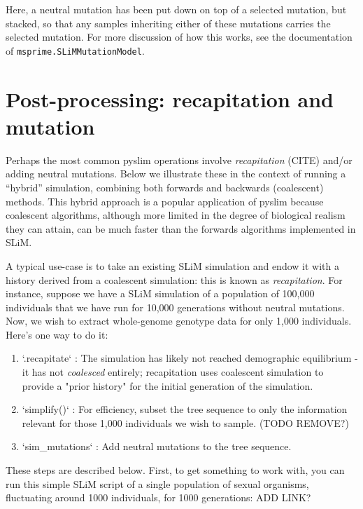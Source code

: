 \documentclass[12pt]{article}
\begin{document}
Here, a neutral mutation has been put down on top of a selected mutation, but stacked,
so that any samples inheriting either of these mutations carries the selected mutation.
For more discussion of how this works, see  the documentation of \verb|msprime.SLiMMutationModel|.



\section*{Post-processing: recapitation and mutation}

Perhaps the most common pyslim operations involve \textit{recapitation} (CITE)
and/or adding neutral mutations.
Below we illustrate these in the context of running a ``hybrid'' simulation, combining
both forwards and backwards (coalescent) methods. This hybrid approach is a popular
application of pyslim because coalescent algorithms, although more limited in the degree
of biological realism they can attain, can be much faster than the forwards algorithms
implemented in SLiM.

A typical use-case is to take an existing SLiM simulation and endow
it with a history derived from a coalescent simulation: this is known as \textit{recapitation}.
For instance, suppose we have a SLiM simulation of a population of 100,000 individuals
that we have run for 10,000 generations without neutral mutations. Now, we wish to
extract whole-genome genotype data for only 1,000 individuals. Here's one way to do it:

\begin{enumerate}
    \item `.recapitate` :
       The simulation has likely not reached demographic equilibrium - it has not
        \textit{coalesced} entirely; recapitation uses coalescent simulation to provide
       a "prior history" for the initial generation of the simulation.

    \item `simplify()` : For efficiency, subset the tree
       sequence to only the information relevant for those 1,000 individuals
        we wish to sample. (TODO REMOVE?)

    \item `sim\_mutations` : Add neutral mutations to the tree sequence.
\end{enumerate}

These steps are described below. First, to get something to work with,
you can run this simple SLiM script of a single population of sexual organisms,
fluctuating around 1000 individuals, for 1000 generations: ADD LINK?
\end{document}
